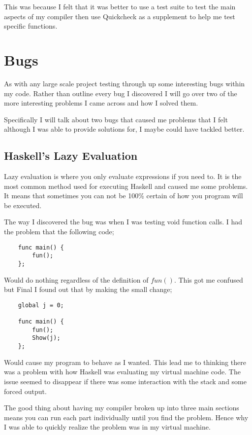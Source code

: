 This was because I felt that it was better to use a test suite to test the main aspects of my compiler then use Quickcheck as a supplement to help me test specific functions.  

\section{Bugs} 

As with any large scale project testing through up some interesting bugs within my code. Rather than outline every bug I discovered I will go over two of the more interesting problems I came across and how I solved them.

Specifically I will talk about two bugs that caused me problems that I felt although I was able to provide solutions for, I maybe could have tackled better.


\subsection{Haskell's Lazy Evaluation}

Lazy evaluation is where you only evaluate expressions if you need to. It is the most common method used for executing Haskell and caused me some problems. It means that sometimes you can not be 100\% certain of how you program will be executed.

The way I discovered the bug was when I was testing void function calls. I had the problem that the following code;

\begin{lstlisting}
	func main() {
		fun();
	};
\end{lstlisting}

Would do nothing regardless of the definition of $fun()$. This got me confused but Final I found out that by making the small change;

\begin{lstlisting}
	global j = 0;
	
	func main() {
		fun();
		Show(j);
	};
\end{lstlisting}

Would cause my program to behave as I wanted. This lead me to thinking there was a problem with how Haskell was evaluating my virtual machine code. The issue seemed to disappear if there was some interaction with the stack and some forced output.

The good thing about having my compiler broken up into three main sections means you can run each part individually until you find the problem. Hence why I was able to quickly realize the problem was in my virtual machine.   

